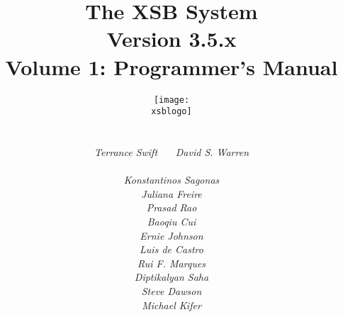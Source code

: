 \documentclass[12pt]{report}
\newcommand{\version}{Version 3.5}
\newcommand{\xsblogo}{{xsb-logo}}
\begin{document}
\title{\bf The XSB System \\ \version .x\\ Volume 1: Programmer's Manual}

\author{{\texttt{[image: \\xsblogo]}}\\
        \ \\ \ \\
        {\em Terrance Swift} \ \ \ 
        {\em David S. Warren} \\ 
        \ \\
        {\em Konstantinos Sagonas} \\
        {\em Juliana Freire} \\
        {\em Prasad Rao} \\
        {\em Baoqiu Cui} \\
        {\em Ernie Johnson} \\
        {\em Luis de Castro} \\
        {\em Rui F. Marques} \\
        {\em Diptikalyan Saha} \\
        {\em Steve Dawson} \\
        {\em Michael Kifer} \\
        \ \\
} 

\maketitle

\thispagestyle{empty}


\newpage
\thispagestyle{empty}
\tableofcontents
\newpage        %
  




















\appendix



% 





\printindex
\printindex[pred]
\end{document}
